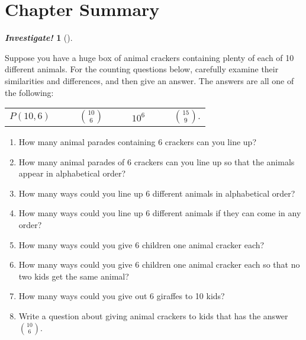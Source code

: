 \documentclass[10pt,]{book}
\theoremstyle{plain}
\theoremstyle{definition}
\theoremstyle{definition}
\newtheorem{investigation}[project]{\emph{Investigate!}}
\theoremstyle{definition}
\numberwithin{equation}{section}
\begin{document}
\section[Chapter Summary]{Chapter Summary}\label{sec_count-conc}
\begin{investigation}[]\label{investigation-14}

        Suppose you have a huge box of animal crackers containing plenty of each of 10 different animals. For the counting questions below, carefully examine their similarities and differences, and then give an answer. The answers are all one of the following:
        \leavevmode%
\begin{table}
\centering
\begin{tabular}{llll}
\(P(10,6)\qquad\)&\({10 \choose 6}\qquad\)&\(10^6\qquad\)&\({15 \choose 9}.\)
\end{tabular}
\end{table}

        \leavevmode%
\begin{enumerate}
\item\hypertarget{li-645}{}
              How many animal parades containing 6 crackers can you line up?
\item\hypertarget{li-646}{}
              How many animal parades of 6 crackers can you line up so that the animals appear in alphabetical order?
\item\hypertarget{li-647}{}
              How many ways could you line up 6 different animals in alphabetical order?
\item\hypertarget{li-648}{}
              How many ways could you line up 6 different animals if they can come in any order?
\item\hypertarget{li-649}{}
              How many ways could you give 6 children one animal cracker each?
\item\hypertarget{li-650}{}
              How many ways could you give 6 children one animal cracker each so that no two kids get the same animal?
\item\hypertarget{li-651}{}
              How many ways could you give out 6 giraffes to 10 kids?
\item\hypertarget{li-652}{}
              Write a question about giving animal crackers to kids that has the answer \({10\choose 6}\).
\end{enumerate}

\end{investigation}
\end{document}
